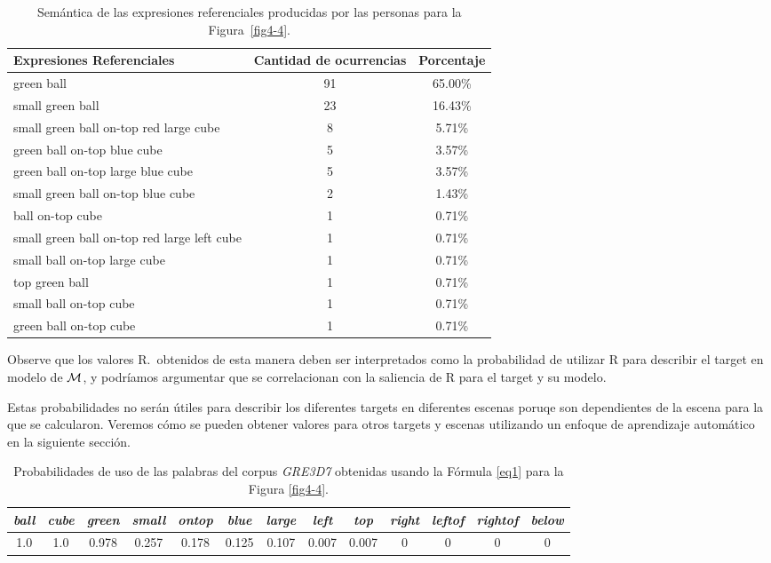 \begin{table}[h!]
\begin{center}
\begin{tabular}{|l|c|c|}
\hline
Expresiones Referenciales & Cantidad de ocurrencias & Porcentaje \\
\hline

green ball & 91 & 65.00\% \\
small green ball   & 23 & 16.43\% \\
small green ball on-top red large cube & 8 & 5.71\% \\
green ball on-top blue cube & 5 & 3.57\% \\
green ball on-top large blue cube & 5 & 3.57\% \\
small green ball on-top blue cube & 2 & 1.43\% \\
ball on-top cube & 1 & 0.71\% \\
small green ball on-top red large left cube  & 1 & 0.71\% \\
small ball on-top large cube & 1 & 0.71\% \\
top green ball  & 1 & 0.71\% \\
small ball on-top cube & 1 & 0.71\% \\
green ball on-top cube & 1 & 0.71\% \\

\hline
\end{tabular}
\caption{Sem\'antica de las expresiones referenciales producidas por las personas para la Figura~\ref{fig4-4}.}\label{corpus-distribution}
\end{center}
\end{table}

Observe que los valores R.\puse\ obtenidos de esta manera deben ser
interpretados como la probabilidad de utilizar R para describir el target en
modelo de $\mathcal{M} $, y podr\'{i}amos argumentar que se correlacionan con la
 saliencia de R para el target y su modelo. 
 
Estas probabilidades no ser\'an \'utiles
para describir los diferentes targets en diferentes escenas poruqe son dependientes de la escena para la que se calcularon. Veremos c\'omo se
pueden obtener valores para otros targets y escenas utilizando un
enfoque de aprendizaje autom\'atico en la siguiente secci\'on. 


\begin{table}[H]
\begin{center}
\begin{tabular}{ccccccccccccc}
\hline
\it{ball} & \it{cube} &  \it{green} & \it{small} &  \it{ontop} &  \it{blue} &  \it{large} &  \it{left} &  \it{top} &\it{right} &  \it{leftof} &    \it{rightof} &\it{below} \\
\hline

1.0 & 1.0 & 0.978 &0.257 &0.178 & 0.125 &0.107  &0.007  &0.007 & 0 &0&0&0\\
\hline
\end{tabular}
\caption{Probabilidades de uso de las palabras del corpus \textit{GRE3D7} obtenidas usando la F\'ormula \ref{eq1} para la Figura \ref{fig4-4}.}  
\label{probability-of-use1}
\end{center}
\end{table}



